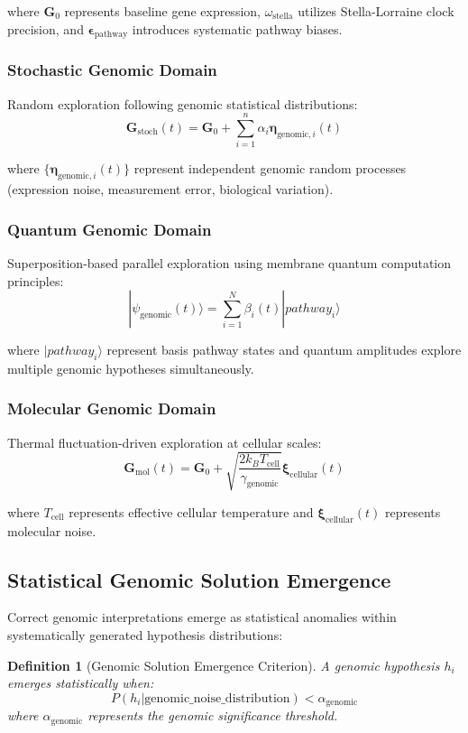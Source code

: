 \documentclass[12pt,a4paper]{article}
\newtheorem{definition}[theorem]{Definition}
\begin{document}
where $\mathbf{G}_0$ represents baseline gene expression, $\omega_{\text{stella}}$ utilizes Stella-Lorraine clock precision, and $\boldsymbol{\epsilon}_{\text{pathway}}$ introduces systematic pathway biases.

\subsubsection{Stochastic Genomic Domain}
Random exploration following genomic statistical distributions:
$$\mathbf{G}_{\text{stoch}}(t) = \mathbf{G}_0 + \sum_{i=1}^n \alpha_i \boldsymbol{\eta}_{\text{genomic},i}(t)$$

where $\{\boldsymbol{\eta}_{\text{genomic},i}(t)\}$ represent independent genomic random processes (expression noise, measurement error, biological variation).

\subsubsection{Quantum Genomic Domain}
Superposition-based parallel exploration using membrane quantum computation principles:
$$|\psi_{\text{genomic}}(t)\rangle = \sum_{i=1}^N \beta_i(t) |pathway_i\rangle$$

where $|pathway_i\rangle$ represent basis pathway states and quantum amplitudes explore multiple genomic hypotheses simultaneously.

\subsubsection{Molecular Genomic Domain}
Thermal fluctuation-driven exploration at cellular scales:
$$\mathbf{G}_{\text{mol}}(t) = \mathbf{G}_0 + \sqrt{\frac{2k_B T_{\text{cell}}}{\gamma_{\text{genomic}}}} \boldsymbol{\xi}_{\text{cellular}}(t)$$

where $T_{\text{cell}}$ represents effective cellular temperature and $\boldsymbol{\xi}_{\text{cellular}}(t)$ represents molecular noise.

\subsection{Statistical Genomic Solution Emergence}

Correct genomic interpretations emerge as statistical anomalies within systematically generated hypothesis distributions:

\begin{definition}[Genomic Solution Emergence Criterion]
A genomic hypothesis $h_i$ emerges statistically when:
$$P(h_i | \text{genomic\_noise\_distribution}) < \alpha_{\text{genomic}}$$
where $\alpha_{\text{genomic}}$ represents the genomic significance threshold.
\end{definition}
\end{document}
